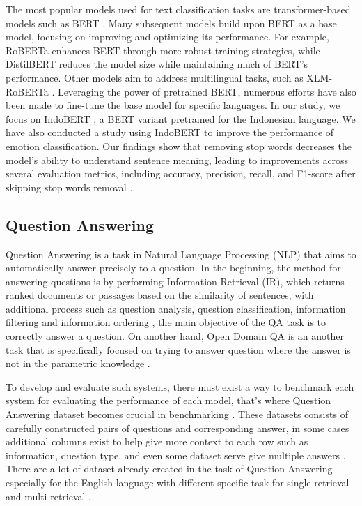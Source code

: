 \documentclass[times]{iapress}
\begin{document}
The most popular models used for text classification tasks are transformer-based models such as BERT \cite{bert}. Many subsequent models build upon BERT as a base model, focusing on improving and optimizing its performance. For example, RoBERTa \cite{roberta} enhances BERT through more robust training strategies, while DistilBERT \cite{distilbert} reduces the model size while maintaining much of BERT’s performance. Other models aim to address multilingual tasks, such as XLM-RoBERTa \cite{xlm_roberta}. Leveraging the power of pretrained BERT, numerous efforts have also been made to fine-tune the base model for specific languages. In our study, we focus on IndoBERT \cite{indobert}, a BERT variant pretrained for the Indonesian language. We have also conducted a study using IndoBERT to improve the performance of emotion classification. Our findings show that removing stop words decreases the model’s ability to understand sentence meaning, leading to improvements across several evaluation metrics, including accuracy, precision, recall, and F1-score after skipping stop words removal \cite{emotion_indobert}.

\subsection{Question Answering}
Question Answering is a task in Natural Language Processing (NLP) that aims to automatically answer precisely to a question. In the beginning, the method for answering questions is by performing Information Retrieval (IR), which returns ranked documents or passages based on the similarity of sentences, with additional process such as question analysis, question classification, information filtering and information ordering  \cite{qa_definition}, the main objective of the QA task is to correctly answer a question. On another hand, Open Domain QA is an another task that is specifically focused on trying to answer question where the answer is not in the parametric knowledge \cite{realm}. 

To develop and evaluate such systems, there must exist a way to benchmark each system for evaluating the performance of each model, that's where Question Answering dataset becomes crucial in benchmarking \cite{system_verification}. These datasets consists of carefully constructed pairs of questions and corresponding answer, in some cases additional columns exist to help give more context to each row such as information, question type, and even some dataset serve give multiple answers \cite{musique} \cite{popqa} \cite{squad}. There are a lot of dataset already created in the task of Question Answering especially for the English language with different specific task for single retrieval \cite{squad} and multi retrieval \cite{musique} \cite{popqa} \cite{hotpotqa}.
\end{document}
